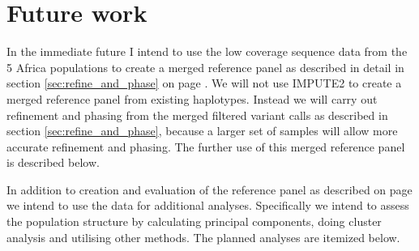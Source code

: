 \chapter{Future work}
\label{ch:future}

In the immediate future I intend to use the low coverage sequence data from the 5 Africa populations to create a merged reference panel as described in detail in section \ref{sec:refine_and_phase} on page \pageref{sec:refine_and_phase}. We will not use IMPUTE2 to create a merged reference panel from existing haplotypes. Instead we will carry out refinement and phasing from the merged filtered variant calls as described in section \ref{sec:refine_and_phase}, because a larger set of samples will allow more accurate refinement and phasing. The further use of this merged reference panel is described below.

In addition to creation and evaluation of the reference panel as described on page we intend to use the data for additional analyses. Specifically we intend to assess the population structure by calculating principal components, doing cluster analysis and utilising other methods. The planned analyses are itemized below.

